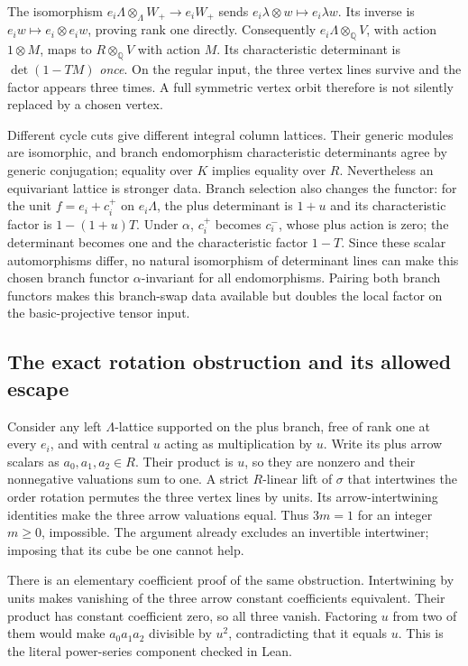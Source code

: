 \documentclass[11pt]{article}
\theoremstyle{definition}\newtheorem{definition}[theorem]{Definition}
\theoremstyle{remark}\newtheorem{remark}[theorem]{Remark}
\begin{document}
The isomorphism $e_i\Lambda\otimes_\Lambda W_+\to e_iW_+$ sends $e_i\lambda\otimes w\mapsto e_i\lambda w$. Its inverse is $e_iw\mapsto e_i\otimes e_iw$, proving rank one directly. Consequently $e_i\Lambda\otimes_{\mathbb Q}V$, with action $1\otimes M$, maps to $R\otimes_{\mathbb Q}V$ with action $M$. Its characteristic determinant is $\det(1-TM)$ \emph{once}. On the regular input, the three vertex lines survive and the factor appears three times. A full symmetric vertex orbit therefore is not silently replaced by a chosen vertex.

Different cycle cuts give different integral column lattices. Their generic modules are isomorphic, and branch endomorphism characteristic determinants agree by generic conjugation; equality over $K$ implies equality over $R$. Nevertheless an equivariant lattice is stronger data. Branch selection also changes the functor: for the unit $f=e_i+c_i^+$ on $e_i\Lambda$, the plus determinant is $1+u$ and its characteristic factor is $1-(1+u)T$. Under $\alpha$, $c_i^+$ becomes $c_i^-$, whose plus action is zero; the determinant becomes one and the characteristic factor $1-T$. Since these scalar automorphisms differ, no natural isomorphism of determinant lines can make this chosen branch functor $\alpha$-invariant for all endomorphisms. Pairing both branch functors makes this branch-swap data available but doubles the local factor on the basic-projective tensor input.

\subsection{The exact rotation obstruction and its allowed escape}
Consider any left $\Lambda$-lattice supported on the plus branch, free of rank one at every $e_i$, and with central $u$ acting as multiplication by $u$. Write its plus arrow scalars as $a_0,a_1,a_2\in R$. Their product is $u$, so they are nonzero and their nonnegative valuations sum to one. A strict $R$-linear lift of $\sigma$ that intertwines the order rotation permutes the three vertex lines by units. Its arrow-intertwining identities make the three arrow valuations equal. Thus $3m=1$ for an integer $m\ge0$, impossible. The argument already excludes an invertible intertwiner; imposing that its cube be one cannot help.

There is an elementary coefficient proof of the same obstruction. Intertwining by units makes vanishing of the three arrow constant coefficients equivalent. Their product has constant coefficient zero, so all three vanish. Factoring $u$ from two of them would make $a_0a_1a_2$ divisible by $u^2$, contradicting that it equals $u$. This is the literal power-series component checked in Lean.
\end{document}
